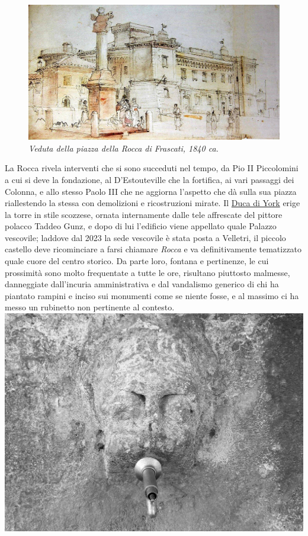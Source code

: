 \documentclass[
  letterpaper,
  DIV=11,
  numbers=noendperiod]{scrartcl}
\begin{document}
\begin{figure}

{\centering \includegraphics{../../images/2024/san_rocco/11rocca-fontana-superiore.jpg}

}

\caption{\emph{Veduta della piazza della Rocca di Frascati, 1840 ca.}}

\end{figure}

La Rocca rivela interventi che si sono succeduti nel tempo, da Pio II
Piccolomini a cui si deve la fondazione, al D'Estouteville che la
fortifica, ai vari passaggi dei Colonna, e allo stesso Paolo III che ne
aggiorna l'aspetto che dà sulla sua piazza riallestendo la stessa con
demolizioni e ricostruzioni mirate. Il
\href{https://grandtour.shop/posts/pages/2017-05-20-frascati-goethe-comandini.html}{Duca
di York} erige la torre in stile scozzese, ornata internamente dalle
tele affrescate del pittore polacco Taddeo Gunz, e dopo di lui
l'edificio viene appellato quale Palazzo vescovile; laddove dal 2023 la
sede vescovile è stata posta a Velletri, il piccolo castello deve
ricominciare a farsi chiamare \emph{Rocca} e va definitivamente
tematizzato quale cuore del centro storico. Da parte loro, fontana e
pertinenze, le cui prossimità sono molto frequentate a tutte le ore,
risultano piuttosto malmesse, danneggiate dall'incuria amministrativa e
dal vandalismo generico di chi ha piantato rampini e inciso sui
monumenti come se niente fosse, e al massimo ci ha messo un rubinetto
non pertinente al contesto.
\includegraphics{../../images/2024/san_rocco/10mascherone.jpg}
\end{document}
